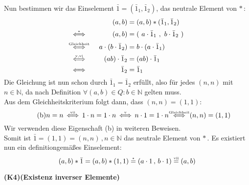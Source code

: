 \documentclass[a4paper,graphics,12pt]{article}
\newcommand{\up}[2]{\mathrel{\overset{\makebox[0pt]{\mbox{\normalfont\tiny #2}}}{#1}}}
\newcommand{\pair}[2]{(\ #1\ ,\ #2\ )}
\begin{document}
    Nun bestimmen wir das Einselement $\bar{1} = (\bar{1}_1,\bar{1}_2)$, das neutrale Element von $*$\,:
    \begin{alignat*}{3}
        &                                       & (a,b)
            &= (a,b) * (\bar{1}_1,\bar{1}_2) \\[1pt]
        &\up{\Longleftrightarrow}{$*$}\quad     & (a,b)
            &= \pair{a\cdot \bar{1}_1}{b\cdot \bar{1}_2} \\[1pt]
        &\up{\Longleftrightarrow}{Gleichheit}   & a\cdot (b\cdot \bar{1}_2)
            &= b \cdot (a\cdot \bar{1}_1) \\[1pt]
        &\up{\Longleftrightarrow}{v,vi}         & (ab)\cdot \bar{1}_2
            &= (ab)\cdot \bar{1}_1\\[1pt] 
        &\up{\Longleftrightarrow}{}             & \bar{1}_2
            &= \bar{1}_1
    \end{alignat*}
    Die Gleichung ist nun schon durch $\bar{1}_1 = \bar{1}_2$ erfüllt,
    also für jedes $(n,n)$ mit $n \in \mathbb{N}$, da nach Definition
    $\forall (a,b) \in Q: b \in \mathbb{N}$ gelten muss.\\
    Aus dem Gleichheitskriterium folgt dann, dass $(n,n) = (1,1)$:
    \begin{equation}
        \tag{b}
        n = n \up{\,\Longleftrightarrow\,}{vii} 1\cdot n = 1\cdot n
        \up{\,\Longleftrightarrow\,}{v} n\cdot 1 = 1\cdot n
        \up{\ \Longleftrightarrow\ }{Gleichheit} (n,n) = (1,1)
    \end{equation}
    Wir verwenden diese Eigenschaft (b) in weiteren Beweisen.\\
    Somit ist $\bar{1} = (1,1) = (n,n)\,,n \in \mathbb{N}$ das neutrale Element von $*$\,.
    Es existiert nun ein definitiongemäßes Einselement:
    $$
        (a,b) * \bar{1} = (a,b) * (1,1) \up{=}{$*$} (a\cdot 1\,,\,b\cdot 1)
        \up{=}{vii} (a,b)
    $$

\textbf{(K4)(Existenz inverser Elemente)}
\end{document}
